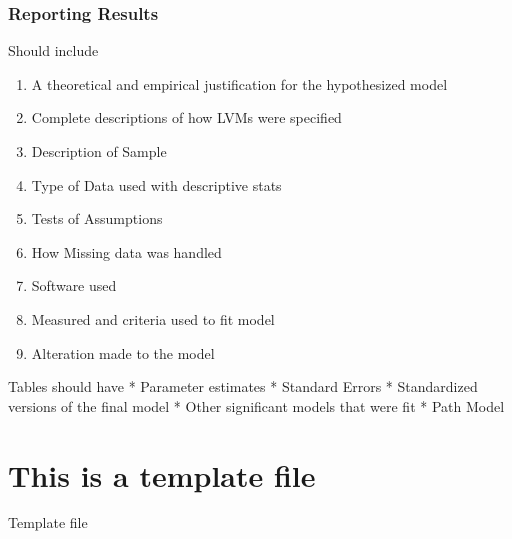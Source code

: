 \documentclass[]{book}
\providecommand{\tightlist}{%
  \setlength{\itemsep}{0pt}\setlength{\parskip}{0pt}}
\theoremstyle{definition}
\theoremstyle{definition}
\theoremstyle{definition}
\theoremstyle{remark}
\begin{document}
\subsection{Reporting Results}\label{reporting-results}

Should include

\begin{enumerate}
\def\labelenumi{\arabic{enumi}.}
\tightlist
\item
  A theoretical and empirical justification for the hypothesized model
\item
  Complete descriptions of how LVMs were specified
\item
  Description of Sample
\item
  Type of Data used with descriptive stats
\item
  Tests of Assumptions
\item
  How Missing data was handled
\item
  Software used
\item
  Measured and criteria used to fit model
\item
  Alteration made to the model
\end{enumerate}

Tables should have * Parameter estimates * Standard Errors *
Standardized versions of the final model * Other significant models that
were fit * Path Model

\chapter{This is a template file}\label{this-is-a-template-file}

Template file


\end{document}
